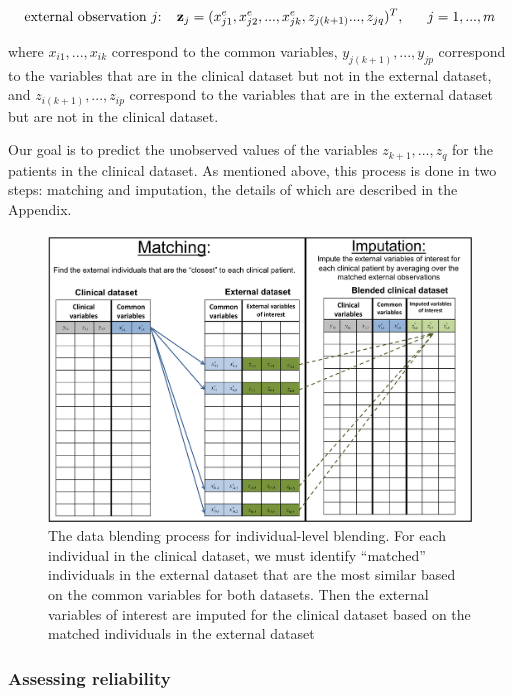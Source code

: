 \documentclass{article}
\begin{document}
$$\text{external observation $j$: }~~{\bf z}_j = (x^e_{j1}, x^e_{j2}, ..., x^e_{jk}, z_{j(k+1)} ..., z_{jq})^T, ~~~~~ j = 1, ..., m$$


where $x_{i1}, ..., x_{ik}$ correspond to the common variables, $y_{j(k+1)}, ..., y_{jp}$ correspond to the variables that are in the clinical dataset but not in the external dataset, and $z_{i(k+1)}, ..., z_{ip}$ correspond to the variables that are in the external dataset but are not in the clinical dataset.

Our goal is to predict the unobserved values of the variables $z_{k+1}, ..., z_q$ for the patients in the clinical dataset. As mentioned above, this process is done in two steps: matching and imputation, the details of which are described in the Appendix.





\begin{figure}[H]
\begin{center}
\includegraphics[scale=0.45]{blending.png}
\end{center}
\caption{The data blending process for individual-level blending. For each individual in the clinical dataset, we must identify ``matched'' individuals in the external dataset that are the most similar based on the common variables for both datasets. Then the external variables of interest are imputed for the clinical dataset based on the matched individuals in the external dataset}
\label{fig:blend}
\end{figure}

\subsubsection{Assessing reliability}
\end{document}
